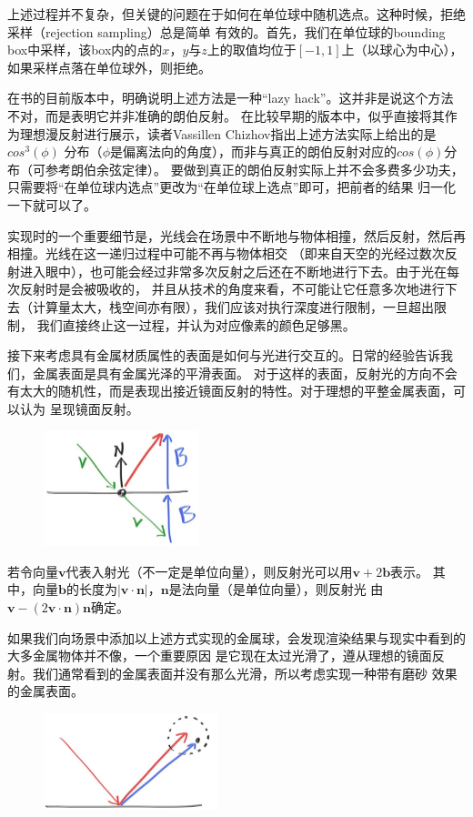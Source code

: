\documentclass[12pt]{article}
\begin{document}
\indent{}上述过程并不复杂，但关键的问题在于如何在单位球中随机选点。这种时候，拒绝采样（rejection sampling）总是简单
有效的。首先，我们在单位球的bounding box中采样，该box内的点的$x$，$y$与$z$上的取值均位于$[-1,1]$上（以球心为中心），
如果采样点落在单位球外，则拒绝。

\indent{}在书的目前版本中，明确说明上述方法是一种“lazy hack”。这并非是说这个方法不对，而是表明它并非准确的朗伯反射。
在比较早期的版本中，似乎直接将其作为理想漫反射进行展示，读者Vassillen Chizhov指出上述方法实际上给出的是$cos^{3}(\phi)$
分布（$\phi$是偏离法向的角度），而非与真正的朗伯反射对应的$cos(\phi)$分布（可参考朗伯余弦定律）。
要做到真正的朗伯反射实际上并不会多费多少功夫，只需要将“在单位球内选点”更改为“在单位球上选点”即可，把前者的结果
归一化一下就可以了。

\indent{}实现时的一个重要细节是，光线会在场景中不断地与物体相撞，然后反射，然后再相撞。光线在这一递归过程中可能不再与物体相交
（即来自天空的光经过数次反射进入眼中），也可能会经过非常多次反射之后还在不断地进行下去。由于光在每次反射时是会被吸收的，
并且从技术的角度来看，不可能让它任意多次地进行下去（计算量太大，栈空间亦有限），我们应该对执行深度进行限制，一旦超出限制，
我们直接终止这一过程，并认为对应像素的颜色足够黑。

\indent{}接下来考虑具有金属材质属性的表面是如何与光进行交互的。日常的经验告诉我们，金属表面是具有金属光泽的平滑表面。
对于这样的表面，反射光的方向不会有太大的随机性，而是表现出接近镜面反射的特性。对于理想的平整金属表面，可以认为
呈现镜面反射。
\begin{figure}[h]
\centering
\includegraphics[width=0.4\textwidth]{./imgs/fig-1.11-reflection.jpg}
\end{figure}

\indent{}若令向量$\mathbf{v}$代表入射光（不一定是单位向量），则反射光可以用$\mathbf{v}+2\mathbf{b}$表示。
其中，向量$\mathbf{b}$的长度为$|\mathbf{v}\cdot\mathbf{n}|$，$\mathbf{n}$是法向量（是单位向量），则反射光
由$\mathbf{v}-(2\mathbf{v}\cdot\mathbf{n})\mathbf{n}$确定。

\indent{}如果我们向场景中添加以上述方式实现的金属球，会发现渲染结果与现实中看到的大多金属物体并不像，一个重要原因
是它现在太过光滑了，遵从理想的镜面反射。我们通常看到的金属表面并没有那么光滑，所以考虑实现一种带有磨砂
效果的金属表面。
\begin{figure}[h]
\centering
\includegraphics[width=0.45\textwidth]{./imgs/fig-1.12-reflect-fuzzy.jpg}
\end{figure}
\end{document}
